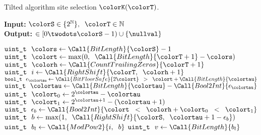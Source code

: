 \begin{algorithm}[H]
\caption{Tilted algorithm site selection $\colorK(\colorT)$.}
\label{alg:tilted-site-selection}
\begin{minipage}{0.53\textwidth}
    \hspace*{\algorithmicindent} \textbf{Input:} $\colorS \in \{2^{\mathbb{N}}\},\;\; \colorT \in \mathbb{N}$ \\
    \hspace*{\algorithmicindent} \textbf{Output:} $\in [0 \twodots \colorS - 1) \cup \{\nullval\}$ 
    \begin{algorithmic}[1]
        \State $\texttt{uint\_t} ~ ~ \colors \gets \Call{BitLength}{\colorS} - 1$
        \State $\texttt{uint\_t} ~ ~ \colort \gets \max(0,\;\; \Call{BitLength}{\colorT+1} - \colors)$ 
        \State $\texttt{uint\_t} ~ ~ \colorh \gets \Call{CountTrailingZeros}{\colorT + 1}$ 
        \Statex
        \State $\texttt{uint\_t} ~ ~ i \gets \Call{RightShift}{\colorT, \;\; \colorh + 1}$ 
        \State $\texttt{bool\_t} ~ ~ \epsilon_{\colortau} \gets \Call{BitFloorSafe}{2\colort} \;\; > \;\; \colort + \Call{BitLength}{\colortau}$ 
        \State $\texttt{uint\_t} ~ ~ \colortau \gets  \Call{BitLength}{\colortau} - \Call{Bool2Int}{\epsilon_{\colortau}}$ 
        \State $\texttt{uint\_t} ~ ~ \colort_0 \gets 2^{\colortau} - \colortau$ 
        \State $\texttt{uint\_t} ~ ~ \colort_1 \gets 2^{\colortau + 1} - (\colortau + 1)$ 
        \State $\texttt{uint\_t} ~ ~ \epsilon_b \gets \Call{Bool2Int}{\colort \;\; < \;\; \colorh + \colort_0 \;\; < \;\; \colort_1}$ 
        \State $\texttt{uint\_t} ~ ~ b \gets \max(1,\;\; \Call{RightShift}{\colorS, \;\; \colortau + 1 - \epsilon_b})$ 
        \Statex
        \State $\texttt{uint\_t} ~ ~ b_l \gets \Call{ModPow2}{i, \;\; b}$ 
        \Statex {}
        \Statex
        \Statex {}
        \Statex {}
        \Statex
        \State $\texttt{uint\_t} ~ ~ v \gets \Call{BitLength}{b_l}$ 

\end{algorithmic}
\end{minipage}
\end{algorithm}
